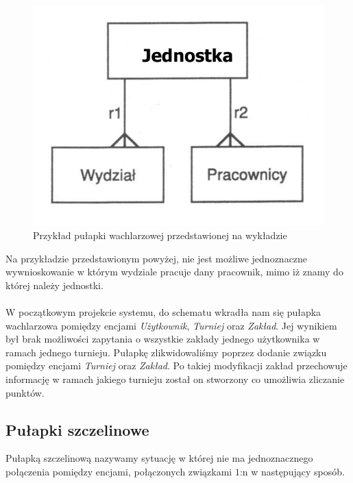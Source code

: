 \documentclass{mwrep}
\begin{document}
\begin{figure}[H]
	\centering
	\includegraphics[scale=0.4]{./wachlarz.png}
	\caption{Przykład pułapki wachlarzowej przedstawionej na wykładzie\cite{Kowalczyk1}}
\end{figure}

Na przykładzie przedstawionym powyżej, nie jest możliwe jednoznaczne wywnioskowanie w którym wydziale pracuje dany pracownik, mimo iż znamy 
do której należy jednostki. \\
\\
\indent W początkowym projekcie systemu, do schematu wkradła nam się pułapka wachlarzowa pomiędzy encjami \emph{Użytkownik}, \emph{Turniej} oraz \emph{Zakład}.
Jej wynikiem był brak możliwości zapytania o wszystkie zakłady jednego użytkownika w ramach jednego turnieju. Pułapkę zlikwidowaliśmy
poprzez dodanie związku pomiędzy encjami \emph{Turniej} oraz \emph{Zakład}. Po takiej modyfikacji zakład przechowuje informację w ramach jakiego turnieju został on stworzony
co umożliwia zliczanie punktów.
\newpage
\subsection{Pułapki szczelinowe}
Pułapką szczelinową nazywamy sytuację w której nie ma jednoznacznego połączenia pomiędzy encjami, połączonych związkami $1$:n w następujący sposób.
\end{document}
